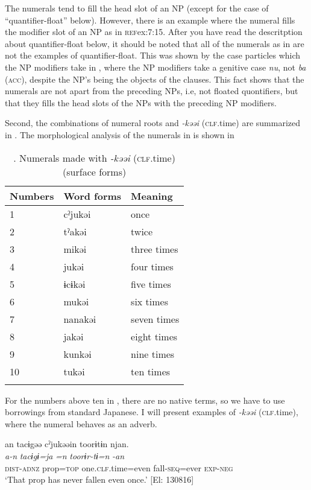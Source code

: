     \z
\z

The numerals tend to fill the head slot of an NP (except for the case of “quantifier-float” below). However, there is an example where the numeral fills the modifier slot of an NP as in \textsc{ref}{ex:7:15}. After you have read the descritption about quantifier-float below, it should be noted that all of the numerals as in  are not the examples of quantifier-float. This was shown by the case particles which the NP modifiers take in , where the NP modifiers take a genitive case \textit{nu}, not \textit{ba} (\textsc{acc}), despite the NP’s being the objects of the clauses. This fact shows that the numerals are not apart from the preceding NPs, i.e, not floated quontifiers, but that they fills the head slots of the NPs with the preceding NP modifiers.

Second, the combinations of numeral roots and \textit{{}-kəəi} (\textsc{clf}.time) are summarized in . The morphological analysis of the numerals in  is shown in 

\begin{table}
\caption{\label{tab:key:48}. Numerals made with \textit{-kəəi} (\textsc{clf}.time) (surface forms)}
\begin{tabular}{lll}
\lsptoprule
Numbers & Word forms  & Meaning\\
\midrule
1 & cˀjukəi&  once        \\
2 & tˀakəi & twice        \\
3 & mikəi  &three times   \\
4 & jukəi  &four times    \\
5 & ɨcɨkəi & five times   \\
6 & mukəi  &six times     \\
7 & nanakəi&  seven times \\
8 & jakəi  &eight times   \\
9 & kunkəi & nine times   \\
10&  tukəi & ten times    \\
\lspbottomrule
\end{tabular}
\end{table}

For the numbers above ten in , there are no native terms, so we have to use borrowings from standard Japanese. I will present examples of \textit{{}-kəəi} (\textsc{clf}.time), where the numeral behaves as an adverb.

\ea \label{ex:7:13}
\ea \label{ex:7:13a}{\TM}
\glll  an  tacɨgəə  cˀjukəəin  toorɨtɨn  njan.\\
\textit{a-n}  \textit{tacɨgɨ=ja}  \textit{=n}  \textit{toorɨr-tɨ=n}  \textit{-an}\\
\textsc{dist}-\textsc{adnz}  prop=\textsc{top}  one.\textsc{clf}.time=even  fall-\textsc{seq}=ever  \textsc{exp}-\textsc{neg}\\
\glt ‘That prop has never fallen even once.’ [El: 130816]

